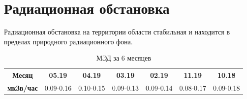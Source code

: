 \section{Радиационная обстановка}
\begin{frame}{\insertsectionhead}

    Радиационная обстановка на территории области стабильная и 
    находится в пределах природного радиационного фона.

    \medskip

    \begin{table}
        \begin{tabular}{|c|c|c|c|c|c|c|}
            \hline
            \textbf{Месяц} &
            05.19 &
            04.19 &
            03.19 &
            02.19 &
            11.19 &
            10.18 \\
            \hline
            \textbf{мкЗв/час} &
            0.09-0.16 &
            0.10-0.15 &
            0.09-0.13 &
            0.09-0.14 &
            0.08-0.17 &
            0.09-0.18 \\
            \hline
        \end{tabular}
        \caption{МЭД за 6 месяцев}
    \end{table}
\end{frame}
